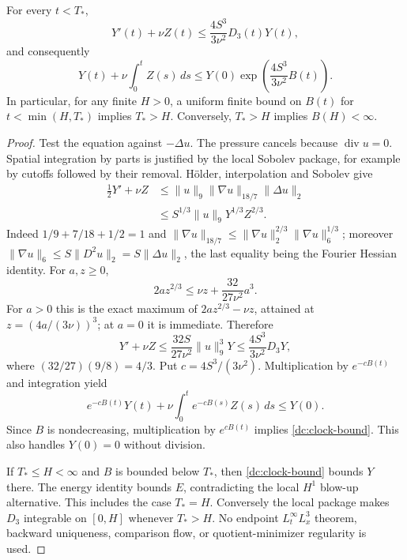 \begin{proposition}
\label{dc:clock}
For every $t<T_*$,
\begin{equation}\label{dc:clock-differential}
 Y'(t)+\nu Z(t)\le \frac{4S^3}{3\nu^2}D_3(t)Y(t),
\end{equation}
and consequently
\begin{equation}\label{dc:clock-bound}
 Y(t)+\nu\int_0^t Z(s)\,ds
 \le Y(0)\exp\!\left(\frac{4S^3}{3\nu^2}B(t)\right).
\end{equation}
In particular, for any finite $H>0$, a uniform finite bound on
$B(t)$ for $t<\min(H,T_*)$ implies $T_*>H$.  Conversely, $T_*>H$ implies
$B(H)<\infty$.
\end{proposition}
\begin{proof}
Test the equation against $-\Delta u$.  The pressure cancels because
$\operatorname{div}u=0$.  Spatial integration by parts is justified by the
local Sobolev package, for example by cutoffs followed by their removal.
H\"older, interpolation and Sobolev give
\begin{align*}
 \frac12Y'+\nu Z
 &\le \|u\|_9\|\nabla u\|_{18/7}\|\Delta u\|_2\\
 &\le S^{1/3}\|u\|_9Y^{1/3}Z^{2/3}.
\end{align*}
Indeed $1/9+7/18+1/2=1$ and
$\|\nabla u\|_{18/7}\le\|\nabla u\|_2^{2/3}
\|\nabla u\|_6^{1/3}$; moreover
$\|\nabla u\|_6\le S\|D^2u\|_2=S\|\Delta u\|_2$, the last equality
being the Fourier Hessian identity.  For $a,z\ge0$,
\[
 2az^{2/3}\le\nu z+\frac{32}{27\nu^2}a^3.
\]
For $a>0$ this is the exact maximum of $2az^{2/3}-\nu z$, attained at
$z=(4a/(3\nu))^3$; at $a=0$ it is immediate.  Therefore
\[
 Y'+\nu Z\le\frac{32S}{27\nu^2}\|u\|_9^3Y
 \le\frac{4S^3}{3\nu^2}D_3Y,
\]
where $(32/27)(9/8)=4/3$.  Put $c=4S^3/(3\nu^2)$.  Multiplication by
$e^{-cB(t)}$ and integration yield
\[
 e^{-cB(t)}Y(t)+\nu\int_0^t e^{-cB(s)}Z(s)\,ds\le Y(0).
\]
Since $B$ is nondecreasing, multiplication by $e^{cB(t)}$ implies
\eqref{dc:clock-bound}.  This also handles $Y(0)=0$ without division.

If $T_*\le H<\infty$ and $B$ is bounded below $T_*$, then
\eqref{dc:clock-bound} bounds $Y$ there.  The energy identity bounds $E$,
contradicting the local $H^1$ blow-up alternative.  This includes the case
$T_*=H$.  Conversely the local package makes $D_3$ integrable on $[0,H]$
whenever $T_*>H$.  No endpoint $L^\infty_tL^3_x$ theorem, backward
uniqueness, comparison flow, or quotient-minimizer regularity is used.
\end{proof}

